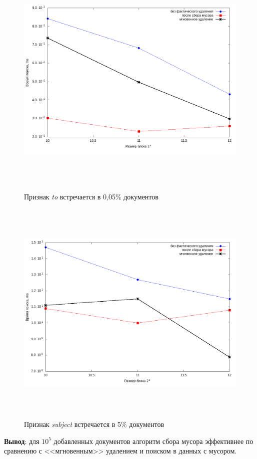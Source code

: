\begin{figure}[H]
\includegraphics[width=\linewidth, height=11cm]{fig/limit_1e6/1e5/to.png}
\caption{Признак \textit{to} встречается в 0,05\% документов}
\includegraphics[width=\linewidth, height=11cm]{fig/limit_1e6/1e5/subject.png}
\caption{Признак \textit{subject} встречается в 5\% документов}
\end{figure}

\textbf{Вывод}: для $10^5$ добавленных документов алгоритм сбора мусора эффективнее
по сравнению с <<мгновенным>> удалением и поиском в данных с мусором.

